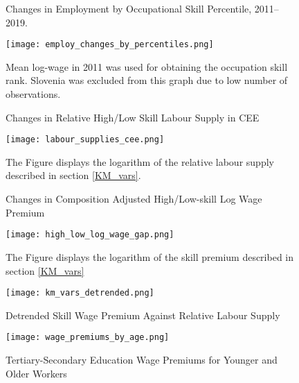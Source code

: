 \documentclass[11pt]{article}
\begin{document}
\begin{figure}[!htbp]%
    \centering
    \caption{Changes in Employment by Occupational Skill Percentile, 2011–2019.}
    {\texttt{[image: employ\_changes\_by\_percentiles.png]}
    }
    \label{employ_changes_percentiles}
    \caption*{\footnotesize Mean log-wage in 2011 was used for obtaining the occupation skill rank. Slovenia was excluded from this graph due to low number of observations. }
\end{figure}

\begin{figure}[!htbp]%
        \centering
        \caption{Changes in Relative High/Low Skill Labour Supply in CEE}
        {\texttt{[image: labour\_supplies\_cee.png]}}
        \label{labour_supplies_cee}
        \caption*{\footnotesize The Figure displays the logarithm of the relative labour supply described in section \ref{KM_vars}.}
\end{figure}

\begin{figure}[!htbp]%
    \centering
    \caption{Changes in Composition Adjusted High/Low-skill Log Wage Premium}
    {\texttt{[image: high\_low\_log\_wage\_gap.png]}}
    \label{high_low_log_wage_gap}
    \caption*{\footnotesize The Figure displays the logarithm of the skill premium described in section \ref{KM_vars}}
\end{figure}


\begin{figure}[!htbp]%
    \centering
    \caption{Detrended Skill Wage Premium Against Relative Labour Supply}
    {\texttt{[image: km\_vars\_detrended.png]} }
    \label{km_vars_detrended}
\end{figure}


\begin{figure}[!htbp]%
    \centering
    \caption{Tertiary-Secondary Education Wage Premiums for Younger and Older Workers}
    {\texttt{[image: wage\_premiums\_by\_age.png]} }
    \label{wage_premiums_by_age}
\end{figure}


\FloatBarrier
\end{document}
